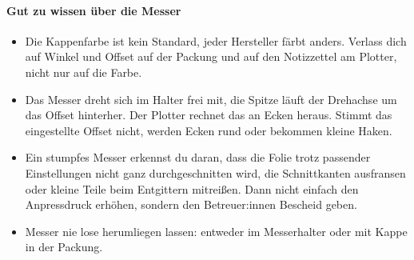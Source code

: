 \documentclass{\basedir/fablab-document}
\begin{document}
\paragraph{Gut zu wissen über die Messer}
\begin{itemize}
 \item Die Kappenfarbe ist kein Standard, jeder Hersteller färbt anders. Verlass dich auf Winkel und Offset auf der Packung und auf den Notizzettel am Plotter, nicht nur auf die Farbe.
 \item Das Messer dreht sich im Halter frei mit, die Spitze läuft der Drehachse um das Offset hinterher. Der Plotter rechnet das an Ecken heraus. Stimmt das eingestellte Offset nicht, werden Ecken rund oder bekommen kleine Haken.
 \item Ein stumpfes Messer erkennst du daran, dass die Folie trotz passender Einstellungen nicht ganz durchgeschnitten wird, die Schnittkanten ausfransen oder kleine Teile beim Entgittern mitreißen. Dann nicht einfach den Anpressdruck erhöhen, sondern den Betreuer:innen Bescheid geben.
 \item Messer nie lose herumliegen lassen: entweder im Messerhalter oder mit Kappe in der Packung.
\end{itemize}
\newcommand{\messer}{
\shadedraw[left color=black!80!white!90!blue,right color=black!30!white] (-0.7,3) -- (-0.7,0) -- (-.2,0) -- (-.2,-2) -- (.7,0) -- (.7,3) -- cycle;
\fill[fill,color=black!20!white] (-.2,-2) -- (.7,0)  -- (.7,.3) --  (-.2,-1.7) -- cycle;
\draw[thick] (-0.7,3) -- (-0.7,0) -- (-.2,0) -- (-.2,-2) -- (.7,0) -- (.7,3) -- cycle;
}
\newcommand{\messerhalter}{
\draw[ultra thick,fill=white!90!black,fill opacity=50] (-2,2.5) -- (-2,-1) .. controls (-2,-1.66) and (2,-1.66) .. (2,-1) -- (2,2.5) -- cycle;
\node at (-.8,2) {Messerhalter}; 

\draw[dashed] (0,-1.6) -- (0,1.8);
\draw[->,very thick] (2.2,1.2) -- ++(1,0) ;
}
\begin{center}
\end{center}
\end{document}
